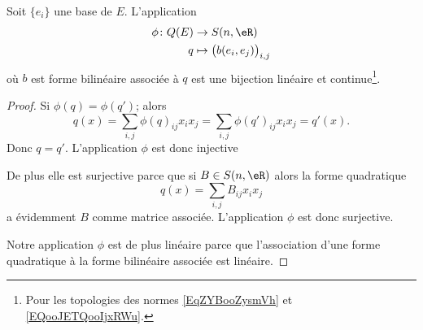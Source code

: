 \begin{proposition} \label{PropFSXooRUMzdb}
    Soit \( \{ e_i \}\) une base de \( E\). L'application
    \begin{equation}
        \begin{aligned}
            \phi\colon Q(E)&\to S(n,\eR) \\
            q&\mapsto \big(   b(e_i,e_j)   \big)_{i,j}
        \end{aligned}
    \end{equation}
    où \( b\) est forme bilinéaire associée à \( q\) est une bijection linéaire et continue\footnote{Pour les topologies des normes \eqref{EqZYBooZysmVh} et \eqref{EQooJETQooIjxRWu}.}.
\end{proposition}

\begin{proof}
    Si \( \phi(q)=\phi(q')\); alors
    \begin{equation}
        q(x)=\sum_{i,j}\phi(q)_{ij}x_ix_j=\sum_{i,j}\phi(q')_{ij}x_ix_j=q'(x).
    \end{equation}
    Donc \( q=q'\). L'application \( \phi\) est donc injective

    De plus elle est surjective parce que si \( B\in S(n,\eR)\) alors la forme quadratique
    \begin{equation}
        q(x)=\sum_{i,j}B_{ij}x_ix_j
    \end{equation}
    a évidemment \( B\) comme matrice associée. L'application \( \phi\) est donc surjective.

    Notre application \( \phi\) est de plus linéaire parce que l'association d'une forme quadratique à la forme bilinéaire associée est linéaire.


\end{proof}
